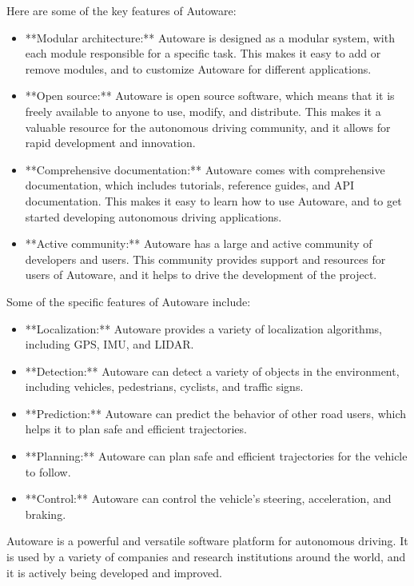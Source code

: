 Here are some of the key features of Autoware:

\begin{itemize}
  \item **Modular architecture:** Autoware is designed as a modular system, with each module responsible for a specific task. This makes it easy to add or remove modules, and to customize Autoware for different applications.
  \item **Open source:** Autoware is open source software, which means that it is freely available to anyone to use, modify, and distribute. This makes it a valuable resource for the autonomous driving community, and it allows for rapid development and innovation.
  \item **Comprehensive documentation:** Autoware comes with comprehensive documentation, which includes tutorials, reference guides, and API documentation. This makes it easy to learn how to use Autoware, and to get started developing autonomous driving applications.
  \item **Active community:** Autoware has a large and active community of developers and users. This community provides support and resources for users of Autoware, and it helps to drive the development of the project.
\end{itemize}

Some of the specific features of Autoware include:

\begin{itemize}
  \item **Localization:** Autoware provides a variety of localization algorithms, including GPS, IMU, and LIDAR.
  \item **Detection:** Autoware can detect a variety of objects in the environment, including vehicles, pedestrians, cyclists, and traffic signs.
  \item **Prediction:** Autoware can predict the behavior of other road users, which helps it to plan safe and efficient trajectories.
  \item **Planning:** Autoware can plan safe and efficient trajectories for the vehicle to follow.
  \item **Control:** Autoware can control the vehicle's steering, acceleration, and braking.
\end{itemize}

Autoware is a powerful and versatile software platform for autonomous driving. It is used by a variety of companies and research institutions around the world, and it is actively being developed and improved.


